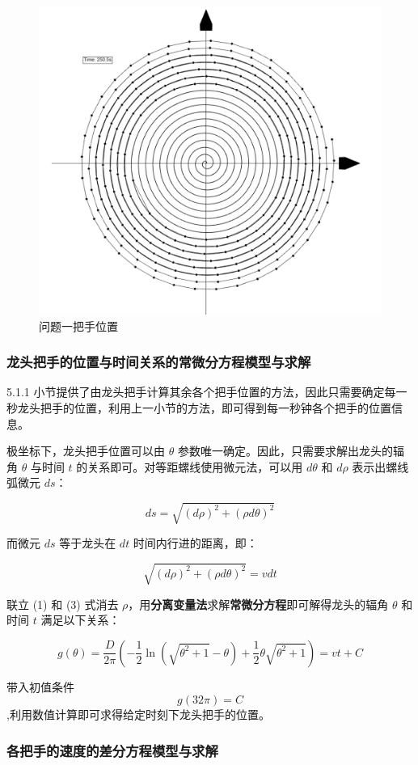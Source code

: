 \documentclass[a4paper]{article}
\begin{document}
		\begin{figure}[H]
			\centering
			\includegraphics[width=0.5\linewidth]{image/Figure_5111.png}
			\caption{问题一把手位置}
			\label{Figure_5111}
		\end{figure}

	\subsubsection{龙头把手的位置与时间关系的常微分方程模型与求解}

		5.1.1 小节提供了由龙头把手计算其余各个把手位置的方法，因此只需要确定每一秒龙头把手的位置，利用上一小节的方法，即可得到每一秒钟各个把手的位置信息。

		极坐标下，龙头把手位置可以由 $\theta$ 参数唯一确定。因此，只需要求解出龙头的辐角 $\theta$ 与时间 $t$ 的关系即可。对等距螺线使用微元法，可以用 $d\theta$ 和 $d\rho$ 表示出螺线弧微元 $ds$：

		$$ ds = \sqrt{(d\rho)^2 + (\rho d\theta) ^ 2}$$

		而微元 $ds$ 等于龙头在 $dt$ 时间内行进的距离，即：

		\begin{equation}
			\sqrt{(d\rho)^2 + (\rho d\theta) ^ 2} = vdt
		\end{equation}

		联立 (1) 和 (3) 式消去 $\rho$，用\textbf{分离变量法}求解\textbf{常微分方程}即可解得龙头的辐角 $\theta$ 和时间 $t$ 满足以下关系：

		\begin{equation}
			g(\theta) = \frac{D}{2\pi}(-\frac{1}{2}\ln(\sqrt{\theta^2+1}-\theta)+\frac{1}{2}\theta\sqrt{\theta^2+1})=vt+C
		\end{equation}

		带入初值条件$$g(32  \pi) = C$$,利用数值计算即可求得给定时刻下龙头把手的位置。

	\subsubsection{各把手的速度的差分方程模型与求解}
\end{document}
